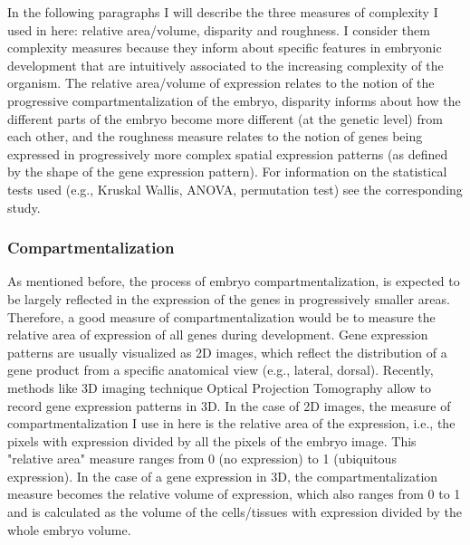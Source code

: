 
In the following paragraphs I will describe the three measures of complexity I used in here: relative area/volume, disparity and roughness. I consider them complexity measures because they inform about specific features in embryonic development that are intuitively associated to the increasing complexity of the organism. The relative area/volume of expression relates to the notion of the progressive compartmentalization of the embryo, disparity informs about how the different parts of the embryo become more different (at the genetic level) from each other, and the roughness measure relates to the notion of genes being expressed in progressively more complex spatial expression patterns (as defined by the shape of the gene expression pattern).  For information on the statistical tests used (e.g., Kruskal Wallis, ANOVA, permutation test) see the corresponding study.


\subsubsection{Compartmentalization}

As mentioned before, the process of embryo compartmentalization, is expected to be largely reflected in the expression of the genes in progressively smaller areas. Therefore, a good measure of compartmentalization would be to measure the relative area of expression of all genes during development.
Gene expression patterns are usually visualized as 2D images, which reflect the distribution of a gene product from a specific anatomical view (e.g., lateral, dorsal).  Recently, methods like 3D imaging technique Optical Projection Tomography  \citep{Sharpe2003,Summerhurst2008} allow to record gene expression patterns in 3D.
%
In the case of 2D images, the measure of compartmentalization I use in here is the relative area of the expression, i.e., the pixels with expression divided by all the pixels of the embryo image. This "relative area" measure ranges from 0 (no expression) to 1 (ubiquitous expression). 
In the case of a gene expression in 3D, the compartmentalization measure becomes the relative volume of expression, which also ranges from 0 to 1 and is calculated as the volume of the cells/tissues with expression divided by the whole embryo volume.

